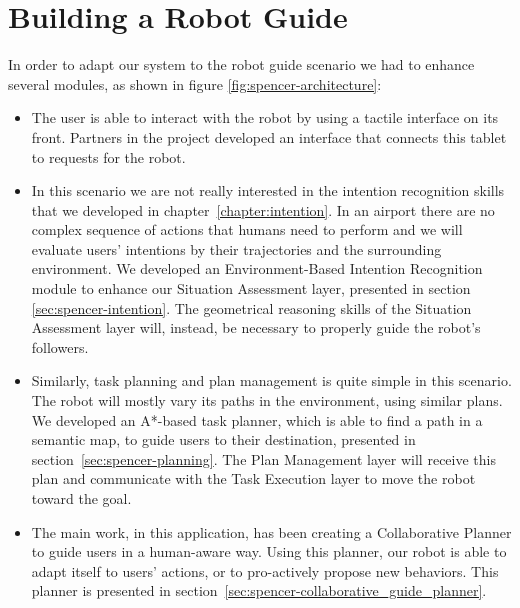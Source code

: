 \section{Building a Robot Guide}
\label{sec:spencer-robot_guide}
In order to adapt our system to the robot guide scenario we had to enhance several modules, as shown in figure \ref{fig:spencer-architecture}: 
\begin{itemize}
\item The user is able to interact with the robot by using a tactile interface on its front. Partners in the project developed an interface that connects this tablet to requests for the robot.
\item In this scenario we are not really interested in the intention recognition skills that we developed in chapter~\ref{chapter:intention}. In an airport there are no complex sequence of actions that humans need to perform and we will evaluate users' intentions by their trajectories and the surrounding environment. We developed an Environment-Based Intention Recognition module to enhance our Situation Assessment layer, presented in section \ref{sec:spencer-intention}. The geometrical reasoning skills of the Situation Assessment layer will, instead, be necessary to properly guide the robot's followers. 
\item Similarly, task planning and plan management is quite simple in this scenario. The robot will mostly vary its paths in the environment, using similar plans. We developed an A*-based task planner, which is able to find a path in a semantic map, to guide users to their destination, presented in section~\ref{sec:spencer-planning}. The Plan Management layer will receive this plan and communicate with the Task Execution layer to move the robot toward the goal.
\item The main work, in this application, has been creating a Collaborative Planner to guide users in a human-aware way. Using this planner, our robot is able to adapt itself to users' actions, or to pro-actively propose new behaviors. This planner is presented in section~\ref{sec:spencer-collaborative_guide_planner}.
\end{itemize} 

